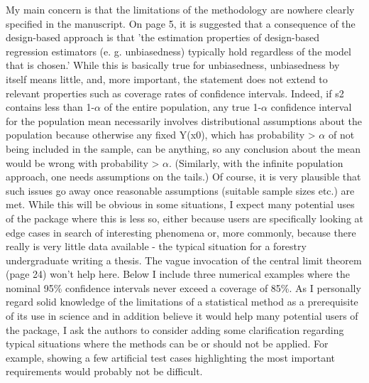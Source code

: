 \documentclass{article}
\begin{document}
My main concern is that the limitations of the methodology are nowhere clearly specified in the manuscript. On page 5, it is suggested that a consequence of the design-based approach is that 'the estimation properties of design-based regression estimators (e. g. unbiasedness) typically hold regardless of the model that is chosen.' While this is basically true for unbiasedness, unbiasedness by itself means little, and, more important, the statement does not extend to relevant properties such as coverage rates of confidence intervals. Indeed, if s2 contains less than 1-$\alpha$ of the entire population, any true 1-$\alpha$ confidence interval for the population mean necessarily involves distributional assumptions about the population because otherwise any fixed Y(x0), which has probability > $\alpha$ of not being included in the sample, can be anything, so any conclusion about the mean would be wrong with probability > $\alpha$. (Similarly, with the infinite population approach, one needs assumptions on the tails.) Of course, it is very plausible that such issues go away once reasonable assumptions (suitable sample sizes etc.) are met. While this will be obvious in some situations, I expect many potential uses of the package where this is less so, either because users are specifically looking at edge cases in search of interesting phenomena or, more commonly, because there really is very little data available - the typical situation for a forestry undergraduate writing a thesis. The vague invocation of the central limit theorem (page 24) won't help here. Below I include three numerical examples where the nominal 95\% confidence intervals never exceed a coverage of 85\%. As I personally regard solid knowledge of the limitations of a statistical method as a prerequisite of its use in science and in addition believe it would help many potential users of the package, I ask the authors to consider adding some clarification regarding typical situations where the methods can be or should not be applied. For example, showing a few artificial test cases highlighting the most important requirements would probably not be difficult.\\
\end{document}
